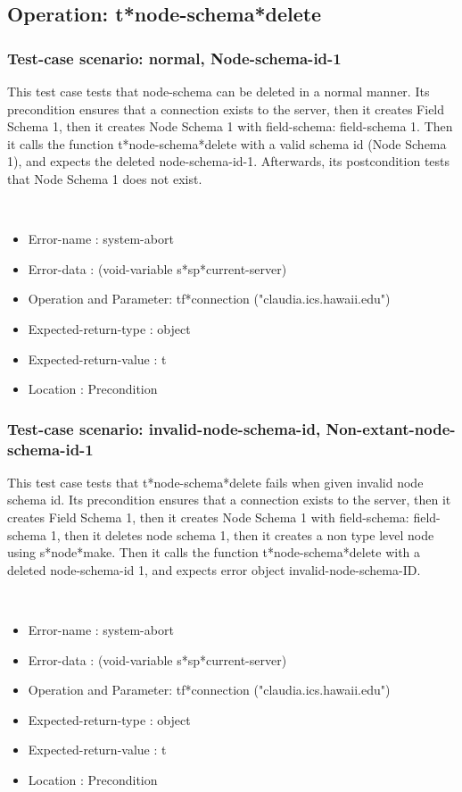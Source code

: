 \subsection {Operation: t*node-schema*delete}
\subsubsection {Test-case scenario: normal, Node-schema-id-1}


This test case tests that node-schema can be deleted in a normal manner.
Its precondition ensures that a connection exists to the server, then it creates Field Schema 1, then it creates Node Schema 1 with field-schema: field-schema 1.
Then it calls the function t*node-schema*delete  with a valid schema id (Node Schema 1), and expects the deleted node-schema-id-1.
Afterwards, its postcondition tests that Node Schema 1 does not exist.


\
\begin {itemize}
\item 	Error-name             : system-abort
\item Error-data             : (void-variable s*sp*current-server)
\item Operation and Parameter: tf*connection ("claudia.ics.hawaii.edu")
\item Expected-return-type   : object
\item Expected-return-value  : t
\item Location               : Precondition



\end {itemize}
\subsubsection {Test-case scenario: invalid-node-schema-id, Non-extant-node-schema-id-1}


This test case tests that t*node-schema*delete fails when given invalid node schema id.
Its precondition ensures that a connection exists to the server, then it creates Field Schema 1, then it creates Node Schema 1 with field-schema: field-schema 1, then it deletes node schema 1, then it creates a non type level node using s*node*make.
Then it calls the function t*node-schema*delete  with a deleted node-schema-id 1, and expects error object invalid-node-schema-ID.



\
\begin {itemize}
\item 	Error-name             : system-abort
\item Error-data             : (void-variable s*sp*current-server)
\item Operation and Parameter: tf*connection ("claudia.ics.hawaii.edu")
\item Expected-return-type   : object
\item Expected-return-value  : t
\item Location               : Precondition



\end {itemize}

